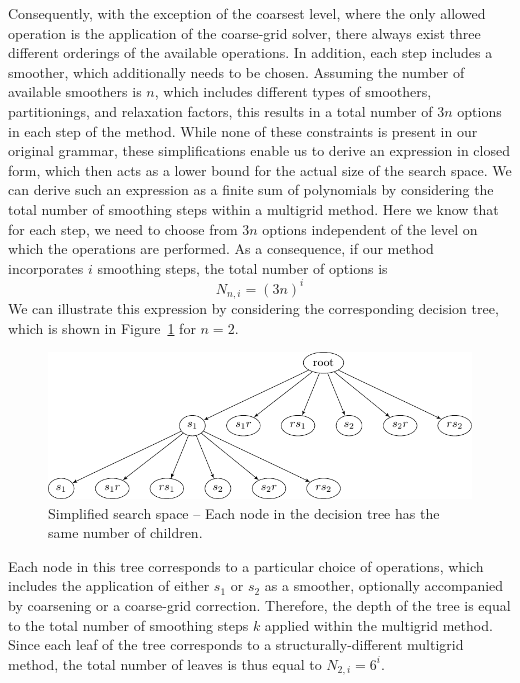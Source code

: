 Consequently, with the exception of the coarsest level, where the only allowed operation is the application of the coarse-grid solver, there always exist three different orderings of the available operations.
In addition, each step includes a smoother, which additionally needs to be chosen.
Assuming the number of available smoothers is $n$, which includes different types of smoothers, partitionings, and relaxation factors, this results in a total number of $3 n$ options in each step of the method.
While none of these constraints is present in our original grammar, these simplifications enable us to derive an expression in closed form, which then acts as a lower bound for the actual size of the search space.
We can derive such an expression as a finite sum of polynomials by considering the total number of smoothing steps within a multigrid method.
Here we know that for each step, we need to choose from $3 n$ options independent of the level on which the operations are performed.
As a consequence, if our method incorporates $i$ smoothing steps, the total number of options is 
\begin{equation}\tag{4.9}
	N_{n,i} = (3 n)^i
	\label{eq:simplified-number-of-options}
\end{equation}
We can illustrate this expression by considering the corresponding decision tree, which is shown in Figure~\ref{fig:decision-tree} for $n = 2$.
\begin{figure}
	\centering
	\includegraphics[width=\textwidth]{figures/trees/decision_tree.pdf}
	\caption[Simplified search space]{Simplified search space -- Each node in the decision tree has the same number of children.}
	\label{fig:decision-tree}
\end{figure}
Each node in this tree corresponds to a particular choice of operations, which includes the application of either $s_1$ or $s_2$ as a smoother, optionally accompanied by coarsening or a coarse-grid correction.
Therefore, the depth of the tree is equal to the total number of smoothing steps $k$ applied within the multigrid method.
Since each leaf of the tree corresponds to a structurally-different multigrid method, the total number of leaves is thus equal to $N_{2,i} = 6^i$.
